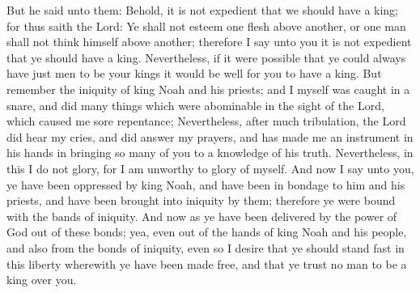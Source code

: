 But he said unto them: Behold, it is not expedient that we should have a king; for thus saith the Lord: Ye shall not esteem one flesh above another, or one man shall not think himself above another; therefore I say unto you it is not expedient that ye should have a king.
\bverse \iffalse Nevertheless, if it were possible that ye could always have just men to be your kings it would be well for you to have a king. \fi
Nevertheless, if it were possible that ye could always have just men to be your kings it would be well for you to have a king.
\bverse \iffalse But remember the iniquity of king Noah and his priests; and I myself was caught in a snare, and did many things which were abominable in the sight of the Lord, which caused me sore repentance; \fi
But remember the iniquity of king Noah and his priests; and I myself was caught in a snare, and did many things which were abominable in the sight of the Lord, which caused me sore repentance;
\bverse \iffalse Nevertheless, after much tribulation, the Lord did hear my cries, and did answer my prayers, and has made me an instrument in his hands in bringing so many of you to a knowledge of his truth. \fi
Nevertheless, after much tribulation, the Lord did hear my cries, and did answer my prayers, and has made me an instrument in his hands in bringing so many of you to a knowledge of his truth.
\bverse \iffalse Nevertheless, in this I do not glory, for I am unworthy to glory of myself. \fi
Nevertheless, in this I do not glory, for I am unworthy to glory of myself.
\bverse \iffalse And now I say unto you, ye have been oppressed by king Noah, and have been in bondage to him and his priests, and have been brought into iniquity by them; therefore ye were bound with the bands of iniquity. \fi
And now I say unto you, ye have been oppressed by king Noah, and have been in bondage to him and his priests, and have been brought into iniquity by them; therefore ye were bound with the bands of iniquity.
\bverse \iffalse And now as ye have been delivered by the power of God out of these bonds; yea, even out of the hands of king Noah and his people, and also from the bonds of iniquity, even so I desire that ye should stand fast in this liberty wherewith ye have been made free, and that ye trust no man to be a king over you. \fi
And now as ye have been delivered by the power of God out of these bonds; yea, even out of the hands of king Noah and his people, and also from the bonds of iniquity, even so I desire that ye should stand fast in this liberty wherewith ye have been made free, and that ye trust no man to be a king over you.

